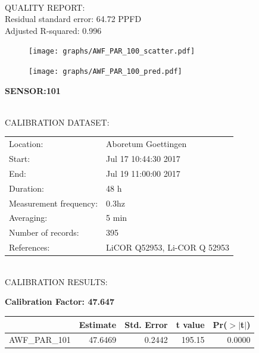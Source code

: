 \documentclass[oneside]{report}
\begin{document}
\hrulefill\\
QUALITY REPORT:\\
Residual standard error: 64.72 PPFD\\
Adjusted R-squared: 0.996



\begin{figure}[H]
  \centering
  \texttt{[image: graphs/AWF\_PAR\_100\_scatter.pdf]}
\end{figure}




\begin{figure}[H]
  \centering
  \texttt{[image: graphs/AWF\_PAR\_100\_pred.pdf]}
\end{figure}

\pagebreak


\begin{center}
\large{\textbf{SENSOR:101}}\\
\end{center}

\hrulefill\\
CALIBRATION DATASET:\\
\begin{table}[h!]
  \centering
  \label{tab:table1}
  \begin{tabular}{ll}
    Location: & Aboretum Goettingen\\ 
    
    
    Start:  & Jul 17 10:44:30 2017 \\
    End:   & Jul 19 11:00:00 2017\\ 
    Duration: & 48 h\\
    Measurement frequency: & 0.3hz\\
    Averaging:  &5 min\\
    Number of records: & 395 \\
    References: & LiCOR Q52953, Li-COR Q 52953 \\
  \end{tabular}
\end{table}

\hrulefill\\
CALIBRATION RESULTS:\\


\begin{center}
\textbf{\large{Calibration Factor: 47.647}}\\
\end{center}
\begin{table}[ht]
\centering
\begin{tabular}{rrrrr}
  \hline
 & Estimate & Std. Error & t value & Pr($>$$|$t$|$) \\ 
  \hline
AWF\_PAR\_101 & 47.6469 & 0.2442 & 195.15 & 0.0000 \\ 
   \hline
\end{tabular}
\end{table}
\end{document}
